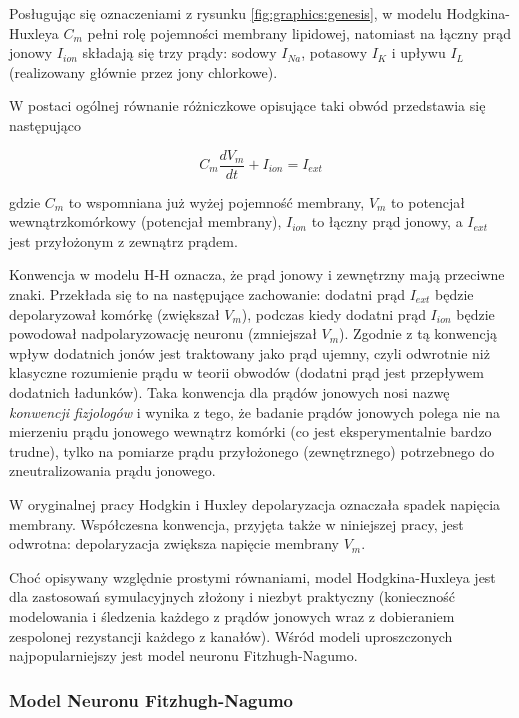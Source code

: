   Posługując się oznaczeniami z rysunku \ref{fig:graphics:genesis}, w modelu Hodgkina-Huxleya $C_{m}$ pełni rolę pojemności membrany lipidowej, natomiast na łączny prąd jonowy $I_{ion}$ składają się trzy prądy: sodowy $I_{Na}$, potasowy $I_{K}$ i upływu $I_{L}$ (realizowany głównie przez jony chlorkowe).

  W postaci ogólnej równanie różniczkowe opisujące taki obwód przedstawia się następująco

  \begin{equation} \label{hh:1}
    C_{m} \frac{dV_{m}}{dt} + I_{ion} = I_{ext}
  \end{equation}

  gdzie $C_{m}$ to wspomniana już wyżej pojemność membrany, $V_{m}$ to potencjał wewnątrzkomórkowy (potencjał membrany), $I_{ion}$ to łączny prąd jonowy, a $I_{ext}$ jest przyłożonym z zewnątrz prądem.

  Konwencja w modelu H-H oznacza, że prąd jonowy i zewnętrzny mają przeciwne znaki. Przekłada się to na następujące zachowanie: dodatni prąd $I_{ext}$ będzie depolaryzował komórkę (zwiększał $V_{m}$), podczas kiedy dodatni prąd $I_{ion}$ będzie powodował nadpolaryzowację neuronu (zmniejszał $V_{m}$). Zgodnie z tą konwencją wpływ dodatnich jonów jest traktowany jako prąd ujemny, czyli odwrotnie niż klasyczne rozumienie prądu w teorii obwodów (dodatni prąd jest przepływem dodatnich ładunków). Taka konwencja dla prądów jonowych nosi nazwę \emph{konwencji fizjologów} i wynika z tego, że badanie prądów jonowych polega nie na mierzeniu prądu jonowego wewnątrz komórki (co jest eksperymentalnie bardzo trudne), tylko na pomiarze prądu przyłożonego (zewnętrznego) potrzebnego do zneutralizowania prądu jonowego.

  W oryginalnej pracy Hodgkin i Huxley depolaryzacja oznaczała spadek napięcia membrany. Współczesna konwencja, przyjęta także w niniejszej pracy, jest odwrotna: depolaryzacja zwiększa napięcie membrany $V_{m}$.

  Choć opisywany względnie prostymi równaniami, model Hodgkina-Huxleya jest dla zastosowań symulacyjnych złożony i niezbyt praktyczny (konieczność modelowania i śledzenia każdego z prądów jonowych wraz z dobieraniem zespolonej rezystancji każdego z kanałów). Wśród modeli uproszczonych najpopularniejszy jest model neuronu Fitzhugh-Nagumo.


  \subsubsection{Model Neuronu Fitzhugh-Nagumo}

